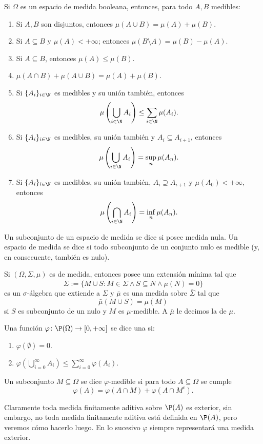 \begin{prop}
	Si $\Omega$ es un espacio de medida booleana, entonces, para todo $A,B$ medibles:
	\begin{enumerate}
		\item Si $A,B$ son disjuntos, entonces $\mu(A\cup B) = \mu(A) + \mu(B)$.
		\item Si $A\subseteq B$ y $\mu(A) < +\infty$; entonces $\mu(B\setminus A) = \mu(B) - \mu(A)$.
		\item Si $A\subseteq B$, entonces $\mu(A) \le \mu(B)$.
		\item $\mu(A\cap B) + \mu(A\cup B) = \mu(A) + \mu(B)$.
		\item Si $\{A_i\}_{i\in\N}$ es medibles y su unión también, entonces
			$$ \mu\left( \bigcup_{i\in\N} A_i \right) \le \sum_{i\in\N} \mu(A_i). $$
		\item Si $\{A_i\}_{i\in\N}$ es medibles, su unión también y $A_i \subseteq A_{i+1}$, entonces
			$$ \mu\left( \bigcup_{i\in\N} A_i \right) = \sup_n\mu(A_n). $$
		\item Si $\{A_i\}_{i\in\N}$ es medibles, su unión también, $A_i \supseteq A_{i+1}$ y $\mu(A_0) < +\infty$, entonces
			$$ \mu\left( \bigcap_{i\in\N} A_i \right) = \inf_n\mu(A_n). $$
	\end{enumerate}
\end{prop}

\begin{mydef}
	Un subconjunto de un espacio de medida se dice  si posee medida nula.
	Un espacio de medida se dice  si todo subconjunto de un conjunto nulo
	es medible (y, en consecuente, también es nulo).
\end{mydef}

\begin{prop}
	Si $(\Omega, \Sigma, \mu)$ es de medida, entonces posee una extensión mínima tal que
	$$ \bar\Sigma := \{ M\cup S: M\in\Sigma\wedge S\subseteq N\wedge \mu(N) = 0 \} $$
	es un $\sigma$-álgebra que extiende a $\Sigma$ y $\bar\mu$ es una medida sobre $\bar\Sigma$ tal que
	$$ \bar\mu(M\cup S) = \mu(M) $$
	si $S$ es subconjunto de un nulo y $M$ es $\mu$-medible.
	A $\bar\mu$ le decimos la  de $\mu$.
\end{prop}

\begin{mydef}
	Una función $\varphi\colon \P(\Omega) \to [0,+\infty]$ se dice una  si:
	\begin{enumerate}
		\item $\varphi(\emptyset) = 0$.
		\item $\varphi\left( \bigcup_{i=0}^\infty A_i \right) \le \sum_{i=0}^\infty \varphi(A_i)$.
	\end{enumerate}
	Un subconjunto $M\subseteq\Omega$ se dice $\varphi$-medible si para todo $A\subseteq\Omega$ se cumple
	$$ \varphi(A) = \varphi(A\cap M) + \varphi(A\cap M^c). $$
\end{mydef}
Claramente toda medida finitamente aditiva sobre $\P(A)$ es exterior,
sin embargo, no toda medida finitamente aditiva está definida en $\P(A)$, pero veremos cómo hacerlo luego.
En lo sucesivo $\varphi$ siempre representará una medida exterior.

